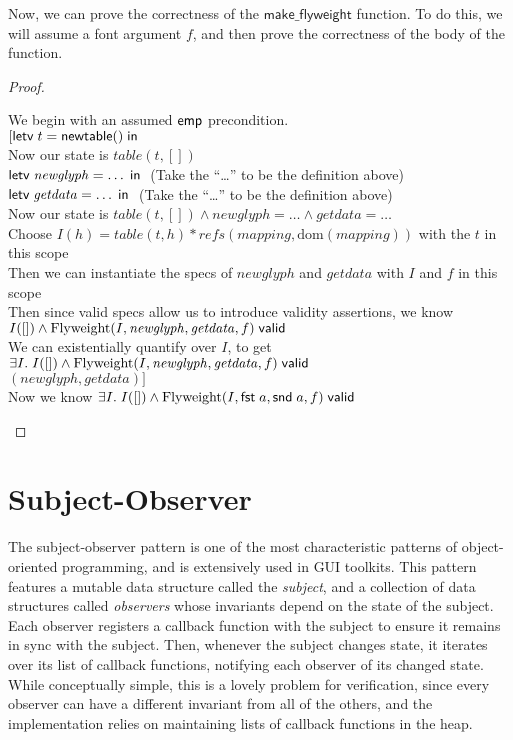 Now, we can prove the correctness of the $\mathsf{make\_flyweight}$ function. To do
this, we will assume a font argument $f$, and then prove the correctness of the body
of the function.
\begin{proof}
\begin{tabbedproof}
\oo We begin with an assumed $\mathsf{emp}$ precondition. \\
\oo $[\mathsf{letv}\;t = \mathsf{newtable}()\;\mathsf{in}\;$ \\
\oo Now our state is $\mathit{table}(t, [])$ \\
\oo $\mathsf{letv}\;\mathit{newglyph} = \ldots\;\mathsf{in}\;$ (Take the ``\ldots'' to be the definition above) \\
\oo $\mathsf{letv}\;\mathit{getdata} = \ldots\;\mathsf{in}\;$ (Take the ``\ldots'' to be the definition above)\\
\oo Now our state is $\mathit{table}(t, []) \land \mathit{newglyph} = \ldots \land \mathit{getdata} = \ldots$ \\
\oo Choose $I(h) = table(t,h) * \mathit{refs}(mapping, \mbox{dom}(mapping))$ with the $t$ in this scope\\
\oo Then we can instantiate the specs of $\mathit{newglyph}$ and $\mathit{getdata}$ with $I$ and $f$ in this scope\\
\oo Then since valid specs allow us to introduce validity assertions, we know  \\
\ox $I([]) \land {\mbox{Flyweight}(I, \mathit{newglyph}, \mathit{getdata}, f)}\;\mathsf{valid}$  \\
\oo We can existentially quantify over $I$, to get \\
\ox $\exists I.\; I([]) \land {\mbox{Flyweight}(I, \mathit{newglyph}, \mathit{getdata}, f)}\;\mathsf{valid}$  \\
\oo $(\mathit{newglyph}, \mathit{getdata})]$\\
\oo Now we know $\exists I.\;I([]) \land {\mbox{Flyweight}(I, \mathsf{fst}\; a, \mathsf{snd}\; a, f)}\;\mathsf{valid}$\\
\end{tabbedproof}
\end{proof}

\section{Subject-Observer}

The subject-observer pattern is one of the most characteristic
patterns of object-oriented programming, and is extensively used in
GUI toolkits. This pattern features a mutable data structure called
the \emph{subject}, and a collection of data structures called
\emph{observers} whose invariants depend on the state of the
subject. Each observer registers a callback function with the subject
to ensure it remains in sync with the subject. Then, whenever the
subject changes state, it iterates over its list of callback
functions, notifying each observer of its changed state. While
conceptually simple, this is a lovely problem for verification, since
every observer can have a different invariant from all of the others,
and the implementation relies on maintaining lists of callback
functions in the heap.  

